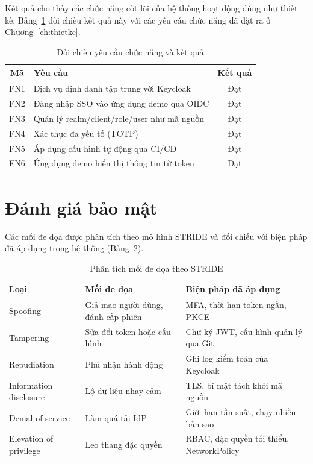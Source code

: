 Kết quả cho thấy các chức năng cốt lõi của hệ thống hoạt động đúng như thiết kế.
Bảng~\ref{tab:ketqua} đối chiếu kết quả này với các yêu cầu chức năng đã đặt ra
ở Chương~\ref{ch:thietke}.

\begin{table}[htbp]
\centering
\caption{Đối chiếu yêu cầu chức năng và kết quả}
\label{tab:ketqua}
\small
\begin{tabular}{c p{8.2cm} c}
\toprule
\textbf{Mã} & \textbf{Yêu cầu} & \textbf{Kết quả}\\
\midrule
FN1 & Dịch vụ định danh tập trung với Keycloak & Đạt\\
FN2 & Đăng nhập SSO vào ứng dụng demo qua OIDC & Đạt\\
FN3 & Quản lý realm/client/role/user như mã nguồn & Đạt\\
FN4 & Xác thực đa yếu tố (TOTP) & Đạt\\
FN5 & Áp dụng cấu hình tự động qua CI/CD & Đạt\\
FN6 & Ứng dụng demo hiển thị thông tin từ token & Đạt\\
\bottomrule
\end{tabular}
\end{table}


\section{Đánh giá bảo mật}
\label{sec:stride}

Các mối đe dọa được phân tích theo mô hình STRIDE và đối chiếu với biện pháp đã
áp dụng trong hệ thống (Bảng~\ref{tab:stride}).

\begin{table}[htbp]
\centering
\caption{Phân tích mối đe dọa theo STRIDE}
\label{tab:stride}
\small
\begin{tabular}{p{2.4cm} p{5.0cm} p{5.4cm}}
\toprule
\textbf{Loại} & \textbf{Mối đe dọa} & \textbf{Biện pháp đã áp dụng}\\
\midrule
Spoofing & Giả mạo người dùng, đánh cắp phiên & MFA, thời hạn token ngắn, PKCE\\
Tampering & Sửa đổi token hoặc cấu hình & Chữ ký JWT, cấu hình quản lý qua Git\\
Repudiation & Phủ nhận hành động & Ghi log kiểm toán của Keycloak\\
Information disclosure & Lộ dữ liệu nhạy cảm & TLS, bí mật tách khỏi mã nguồn\\
Denial of service & Làm quá tải IdP & Giới hạn tần suất, chạy nhiều bản sao\\
Elevation of privilege & Leo thang đặc quyền & RBAC, đặc quyền tối thiểu, NetworkPolicy\\
\bottomrule
\end{tabular}
\end{table}

